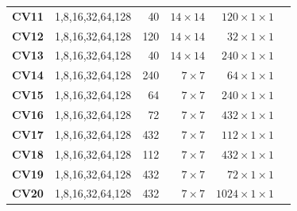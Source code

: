 \begin{table}[]
\begin{threeparttable}
\begin{tabular}{lrrrrr}
\textbf{CV11} & 1,8,16,32,64,128  & 40    & $14\times 14$   & $120 \times 1\times 1$\\
\textbf{CV12} & 1,8,16,32,64,128  & 120   & $14\times 14$   & $32 \times 1\times 1$\\
\textbf{CV13} & 1,8,16,32,64,128  & 40    & $14\times 14$   & $240 \times 1\times 1$\\
\textbf{CV14} & 1,8,16,32,64,128  & 240   & $7\times 7$     & $64  \times 1\times 1$\\
\textbf{CV15} & 1,8,16,32,64,128  & 64    & $7\times 7$     & $240 \times 1\times 1$\\
\textbf{CV16} & 1,8,16,32,64,128  & 72    & $7\times 7$     & $432 \times 1\times 1$\\
\textbf{CV17} & 1,8,16,32,64,128  & 432   & $7\times 7$     & $112 \times 1\times 1$\\
\textbf{CV18} & 1,8,16,32,64,128  & 112   & $7\times 7$     & $432 \times 1\times 1$\\
\textbf{CV19} & 1,8,16,32,64,128  & 432   & $7\times 7$     & $72 \times 1\times 1$\\
\textbf{CV20} & 1,8,16,32,64,128  & 432   & $7\times 7$     & $1024 \times 1\times 1$\\

\bottomrule
\end{tabular}
\end{threeparttable}
\end{table}



